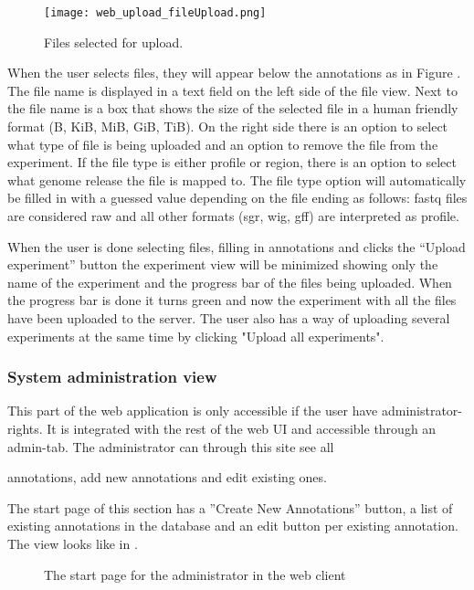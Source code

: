 \begin{figure}[h]
\centering
\texttt{[image: web\_upload\_fileUpload.png]}
\caption{\label{fig:web_upload_fileUpload}Files selected for upload.}
\end{figure}
 
When the user selects files, they will appear below the annotations as in Figure . The file name is displayed in a text field on the left side of the file view. Next to the file name is a box that shows the size of the selected file in a human friendly format (B, KiB, MiB, GiB, TiB). On the right side there is an option to select what type of file is being uploaded and an option to remove the file from the experiment. If the file type is either profile or region, there is an option to select what genome release the file is mapped to. The file type option will automatically be filled in with a guessed value depending on the file ending as follows: fastq files are considered raw and all other formats (sgr, wig, gff) are interpreted as profile.

When the user is done selecting files, filling in annotations and clicks the “Upload experiment” button the experiment view will be minimized showing only the name of the experiment and the progress bar of the files being uploaded. When the progress bar is done it turns green and now the experiment with all the files have been uploaded to the server. The user also has a way of uploading several experiments at the same time by clicking "Upload all experiments". 

\subsubsection{System administration view}

This part of the web application is only accessible if the user have administrator-rights. It is integrated with the rest of the web UI and accessible through an admin-tab. The administrator can through this site see all 

annotations, add new annotations and edit existing ones.

The start page of this section has a ''Create New Annotations'' button, a list of existing annotations in the database and an edit button per existing annotation. 
The view looks like in . 

\begin{figure}[h]
 \caption{The start page for the administrator in the web client}
 \label{adm__web_annotationView}
\end{figure}


